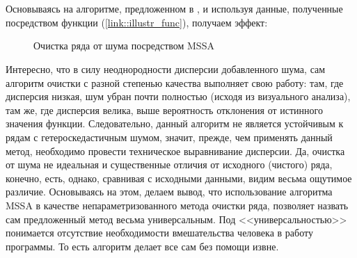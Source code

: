  \label{link::mssa}
\\\\
Основываясь на алгоритме, предложенном в \cite{kuang2020efficient}, и используя данные, полученные посредством функции (\ref{link::illustr_func}), получаем эффект:
\begin{figure}[H]
	\centering
	\caption{Очистка ряда от шума посредством MSSA}
\end{figure}
\noindent Интересно, что в силу неоднородности дисперсии добавленного шума, сам алгоритм очистки с разной степенью качества выполняет свою работу: там, где дисперсия низкая, шум убран почти полностью (исходя из визуального анализа), там же, где дисперсия велика, выше вероятность отклонения от истинного значения функции. Следовательно, данный алгоритм не является устойчивым к рядам с гетероскедастичным шумом, значит, прежде, чем применять данный метод, необходимо провести техническое выравнивание дисперсии. Да, очистка от шума не идеальная и существенные отличия от исходного (чистого) ряда, конечно, есть, однако, сравнивая с исходными данными, видим весьма ощутимое различие. Основываясь на этом, делаем вывод, что использование алгоритма MSSA в качестве непараметризованного метода очистки ряда, позволяет назвать сам предложенный метод весьма универсальным. Под <<универсальностью>> понимается отсутствие необходимости вмешательства человека в работу программы. То есть алгоритм делает все сам без помощи извне. 

